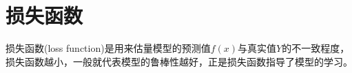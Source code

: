 \section{损失函数}
损失函数(loss function)是用来估量模型的预测值$f(x)$与真实值$Y$的不一致程度，损失函数越小，一般就代表模型的鲁棒性越好，正是损失函数指导了模型的学习。